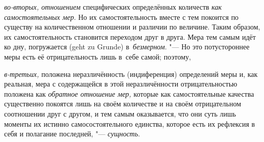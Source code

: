 {\em во-вторых, отношением} специфических определённых количеств
{\em как самостоятельных мер}. Но их самостоятельность вместе с тем покоится по
существу на количественном отношении и различии по величине. Таким образом, их
самостоятельность становится переходом друг в друга. Мера тем самым идёт ко
дну, погружается (geht zu Grunde) в~{\em безмерном}. "--- Но это потустороннее
меры есть её отрицательность лишь в~себе самой; поэтому,

{\em в-третьих,} положена неразличённость (индиференция) определений меры и,
как реальная, мера с содержащейся в этой неразличённости отрицательностью
положена как {\em обратное отношение мер,} которые как самостоятельные качества
существенно покоятся лишь на своём количестве и на своём отрицательном
соотношении друг с другом, и тем самым оказывается, что они суть лишь моменты
их истинно самосостоятельного единства, которое есть их рефлексия в себя и
полагание последней, "--- {\em сущность}.

